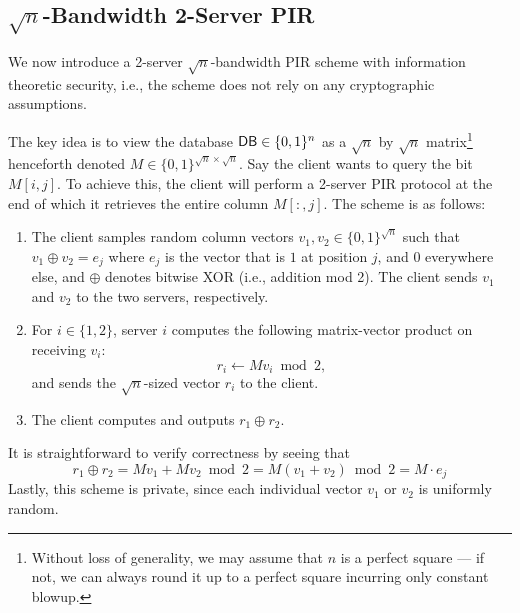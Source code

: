 \subsection{$\sqrt{n}$-Bandwidth 
2-Server PIR} %
\label{sec:sqrtnbw}

We now introduce a 2-server $\sqrt{n}$-bandwidth
PIR scheme 
with information theoretic security, i.e., 
the scheme does not rely on any cryptographic assumptions.

The key idea is to view the database ${\sf DB} \in \{0,1\}^n$ 
as a
$\sqrt{n}$ by $\sqrt{n}$ matrix\footnote{
Without loss of generality, we may assume that $n$ 
is a perfect square --- if not, we can always round it up to a perfect square
incurring only constant blowup.}
henceforth denoted
$M \in \{0, 1\}^{\sqrt{n} \times \sqrt{n}}$.
Say the client wants to query %
the bit $M[i, j]$.
To achieve this, the client will perform
a 2-server PIR protocol
at the  end of which it retrieves
the entire column $M[:, j]$.
The scheme is as follows:
\begin{enumerate}
\item The client samples random column vectors 
$v_{1},v_{2} \in \{0, 1\}^{\sqrt{n}}$ 
such that 
$v_1 \oplus v_2 = e_j$ where $e_j$
is the vector that is $1$    
at position $j$, and $0$ everywhere else,
and $\oplus$ denotes bitwise XOR (i.e., addition mod 2).
The client sends $v_1$ and $v_2$ 
to the two servers, respectively.
	\item For $i \in \{1, 2\}$, 
server $i$ 
computes the following matrix-vector product on receiving $v_i$:
	\[r_{i} \leftarrow M v_{i} \bmod 2, \]
	and sends the $\sqrt{n}$-sized vector $r_{i}$ to the client.
	\item The client computes and outputs $r_{1} \oplus r_{2}$.
\end{enumerate}
It is straightforward to verify correctness by seeing that
\[r_{1} \oplus r_{2} = M v_{1} + M v_{2} \bmod 2 = 
M (v_{1} + v_{2}) \bmod 2 = M \cdot e_j \]
Lastly, this scheme is private, since 
each individual vector $v_{1}$ or $v_{2}$ 
is uniformly random.

